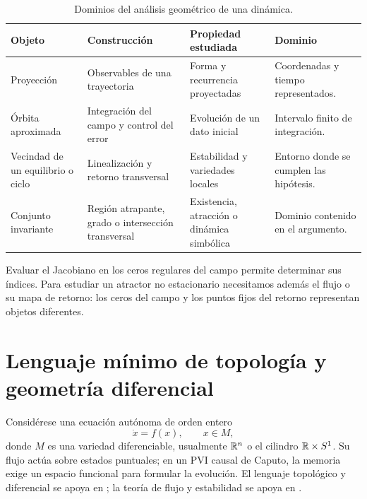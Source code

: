 \begin{table}[H]
\centering
\caption{Dominios del análisis geométrico de una dinámica.}
\label{geo:tab:niveles-evidencia}
\small
\begin{tabularx}{\textwidth}{@{}L{0.20\textwidth}YYY@{}}
\toprule
Objeto & Construcción & Propiedad estudiada & Dominio \\
\midrule
Proyección & Observables de una trayectoria & Forma y recurrencia proyectadas
& Coordenadas y tiempo representados. \\
Órbita aproximada & Integración del campo y control del error & Evolución de
un dato inicial & Intervalo finito de integración. \\
Vecindad de un equilibrio o ciclo & Linealización y retorno transversal &
Estabilidad y variedades locales & Entorno donde se cumplen las hipótesis. \\
Conjunto invariante & Región atrapante, grado o intersección transversal &
Existencia, atracción o dinámica simbólica & Dominio contenido en el argumento. \\
\bottomrule
\end{tabularx}
\end{table}

Evaluar el Jacobiano en los ceros regulares del campo permite determinar sus
índices. Para estudiar un atractor no estacionario necesitamos además
el flujo o su mapa de retorno: los ceros del campo y los puntos fijos del
retorno representan objetos diferentes.

\HAFOStudyNeedspace
\section{Lenguaje mínimo de topología y geometría diferencial}
\label{sec:geo-lenguaje}

\HAFOCardTopology

Considérese una ecuación autónoma de orden entero
\begin{equation}
  \dot x=f(x),\qquad x\in M,
  \label{geo:eq:edo-manifold}
\end{equation}
donde \(M\) es una variedad diferenciable, usualmente \(\mathbb{R}^n\) o el cilindro
\(\mathbb{R}\times S^1\). Su flujo actúa sobre estados puntuales; en un PVI causal
de Caputo, la memoria exige un espacio funcional para formular la evolución.
El lenguaje topológico y diferencial se apoya en
\cite{NahmadAchar2022Topologia}; la teoría de flujo y estabilidad se apoya en
\cite{JaurezEtAl2021TGEDI,JaurezEtAl2021TGEDII,HirschSmaleDevaney2013}.

